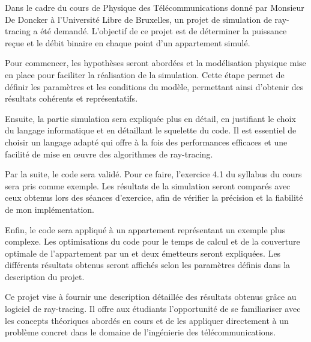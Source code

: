 Dans le cadre du cours de Physique des Télécommunications donné par Monsieur De Doncker à l'Université Libre de Bruxelles, un projet de simulation de ray-tracing a été demandé. L'objectif de ce projet est de déterminer la puissance reçue et le débit binaire en chaque point d'un appartement simulé.

Pour commencer, les hypothèses seront abordées et la modélisation physique mise en place pour faciliter la réalisation de la simulation. Cette étape permet de définir les paramètres et les conditions du modèle, permettant ainsi d'obtenir des résultats cohérents et représentatifs.

Ensuite, la partie simulation sera expliquée plus en détail, en justifiant le choix du langage informatique et en détaillant le squelette du code. Il est essentiel de choisir un langage adapté qui offre à la fois des performances efficaces et une facilité de mise en œuvre des algorithmes de ray-tracing.

Par la suite, le code sera validé. Pour ce faire, l'exercice 4.1 du syllabus du cours sera pris comme exemple. Les résultats de la simulation seront comparés avec ceux obtenus lors des séances d'exercice, afin de vérifier la précision et la fiabilité de mon implémentation.

Enfin, le code sera appliqué à un appartement représentant un exemple plus complexe. Les optimisations du code pour le temps de calcul et de la couverture optimale de l'appartement par un et deux émetteurs seront expliquées. Les différents résultats obtenus seront affichés selon les paramètres définis dans la description du projet.

Ce projet vise à fournir une description détaillée des résultats obtenus grâce au logiciel de ray-tracing. Il offre aux étudiants l'opportunité de se familiariser avec les concepts théoriques abordés en cours et de les appliquer directement à un problème concret dans le domaine de l'ingénierie des télécommunications.
